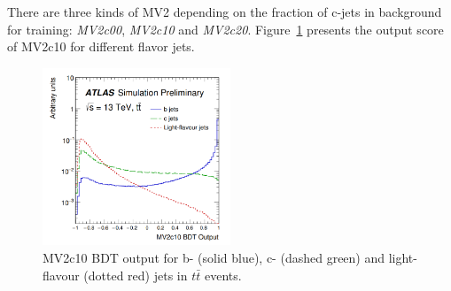 There are three kinds of MV2 depending on the fraction of c-jets in background for training: \textit{MV2c00}, \textit{MV2c10} and \textit{MV2c20}.
Figure~\ref{fig:jet_mv2} presents the output score of MV2c10 for different flavor jets.
\begin{figure}[!htb]
  \centering
  \includegraphics[width=0.5\textwidth]{figures/Simulation/jet_mv2c10.png}
  \caption{MV2c10 BDT output for b- (solid blue), c- (dashed green) and light-flavour (dotted red) jets in $t\bar{t}$ events\cite{ATL-PHYS-PUB-2016-012}.}
  \label{fig:jet_mv2}
\end{figure}

